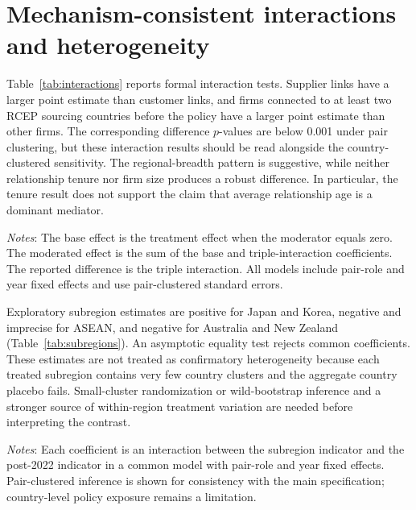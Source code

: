 \documentclass[preprint,12pt,authoryear]{elsarticle}
\begin{document}
\section{Mechanism-consistent interactions and heterogeneity}

Table~\ref{tab:interactions} reports formal interaction tests. Supplier links have a larger point estimate than customer links, and firms connected to at least two RCEP sourcing countries before the policy have a larger point estimate than other firms. The corresponding difference $p$-values are below 0.001 under pair clustering, but these interaction results should be read alongside the country-clustered sensitivity. The regional-breadth pattern is suggestive, while neither relationship tenure nor firm size produces a robust difference. In particular, the tenure result does not support the claim that average relationship age is a dominant mediator.

\begin{table}[htbp]
\centering
\caption{Mechanism-consistent and firm-level interaction tests}
\label{tab:interactions}
\resizebox{\textwidth}{!}{}
\begin{minipage}{0.96\textwidth}\footnotesize
\textit{Notes}: The base effect is the treatment effect when the moderator equals zero. The moderated effect is the sum of the base and triple-interaction coefficients. The reported difference is the triple interaction. All models include pair-role and year fixed effects and use pair-clustered standard errors.
\end{minipage}
\end{table}

Exploratory subregion estimates are positive for Japan and Korea, negative and imprecise for ASEAN, and negative for Australia and New Zealand (Table~\ref{tab:subregions}). An asymptotic equality test rejects common coefficients. These estimates are not treated as confirmatory heterogeneity because each treated subregion contains very few country clusters and the aggregate country placebo fails. Small-cluster randomization or wild-bootstrap inference and a stronger source of within-region treatment variation are needed before interpreting the contrast.

\begin{table}[htbp]
\centering
\caption{Exploratory estimates by RCEP subregion}
\label{tab:subregions}

\begin{minipage}{0.88\textwidth}\footnotesize
\textit{Notes}: Each coefficient is an interaction between the subregion indicator and the post-2022 indicator in a common model with pair-role and year fixed effects. Pair-clustered inference is shown for consistency with the main specification; country-level policy exposure remains a limitation.
\end{minipage}
\end{table}
\end{document}
